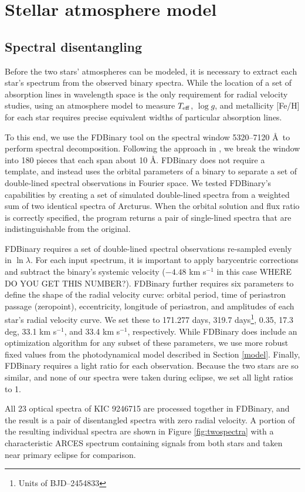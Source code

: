 \section{Stellar atmosphere model}\label{atm}

\subsection{Spectral disentangling}\label{disentangle}
Before the two stars' atmospheres can be modeled, it is necessary to extract each star's spectrum from the observed binary spectra. While the location of a set of absorption lines in wavelength space is the only requirement for radial velocity studies, using an atmosphere model to measure $T_{\rm{eff}}$, $\log g$, and metallicity [Fe/H] for each star requires precise equivalent widths of particular absorption lines.

To this end, we use the FDBinary tool \citep{ili04} on the spectral window 5320--7120 \AA \ to perform spectral decomposition. Following the approach in \citet{bec14}, we break the window into 180 pieces that each span about 10 \AA. FDBinary does not require a template, and instead uses the orbital parameters of a binary to separate a set of double-lined spectral observations in Fourier space. We tested FDBinary's capabilities by creating a set of simulated double-lined spectra from a weighted sum of two identical spectra of Arcturus. When the orbital solution and flux ratio is correctly specified, the program returns a pair of single-lined spectra that are indistinguishable from the original.

FDBinary requires a set of double-lined spectral observations re-sampled evenly in $\ln \lambda$. For each input spectrum, it is important to apply barycentric corrections and subtract the binary's systemic velocity ($-4.48$ km s$^{-1}$ in this case WHERE DO YOU GET THIS NUMBER?). FDBinary further requires six parameters to define the shape of the radial velocity curve: orbital period, time of periastron passage (zeropoint), eccentricity, longitude of periastron, and amplitudes of each star's radial velocity curve. We set these to 171.277 days, 319.7 days\footnote{Units of BJD--2454833}, 0.35, 17.3 deg, 33.1 km s$^{-1}$, and 33.4 km s$^{-1}$, respectively. While FDBinary does include an optimization algorithm for any subset of these parameters, we use more robust fixed values from the photodynamical model described in Section \ref{model}. Finally, FDBinary requires a light ratio for each observation. Because the two stars are so similar, and none of our spectra were taken during eclipse, we set all light ratios to 1.

All 23 optical spectra of KIC 9246715 are processed together in FDBinary, and the result is a pair of disentangled spectra with zero radial velocity. A portion of the resulting individual spectra are shown in Figure \ref{fig:twospectra} with a characteristic ARCES spectrum containing signals from both stars and taken near primary eclipse for comparison.

    
    
    
  
  